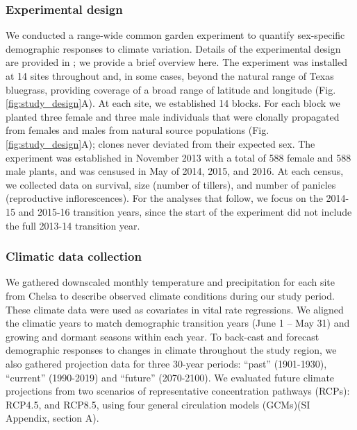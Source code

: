 \documentclass[9pt,twocolumn,twoside,lineno]{pnas-new}
\newcommand{\revise}[1]{{\color{Mahogany}{#1}}}
\begin{document}
\subsubsection*{Experimental design}
We conducted a range-wide common garden experiment to quantify sex-specific demographic responses to climate variation. 
Details of the experimental design are provided in \cite{miller2022two}; we provide a brief overview here. 
The experiment was installed at 14 sites throughout and, in some cases, beyond the natural range of Texas bluegrass, providing coverage of a broad range of latitude and longitude (Fig. \ref{fig:study_design}A).
At each site, we established 14 blocks. 
For each block we planted three female and three male individuals that were clonally propagated from females and males from \revise{\linelabel{sourcepop} seven} natural source populations (Fig. \ref{fig:study_design}A); clones never deviated from their expected sex. 
The experiment was established in November 2013 with a total of 588 female and 588 male plants, and was censused in May of 2014, 2015, and 2016. 
At each census, we collected data on survival, size (number of tillers), and number of panicles (reproductive inflorescences). 
For the analyses that follow, we focus on the 2014-15 and 2015-16 transition years, since the start of the experiment did not include the full 2013-14 transition year. 

\subsubsection*{Climatic data collection}
We gathered downscaled monthly temperature and precipitation for each site from Chelsa \citep{karger2017climatologies} to describe observed climate conditions during our study period.
These climate data were used as covariates in vital rate regressions. 
We aligned the climatic years to match demographic transition years (June 1 -- May 31) and growing and dormant seasons within each year.
To back-cast and forecast demographic responses to changes in climate throughout the study region, we also gathered projection data for three 30-year periods: ``past'' (1901-1930), ``current'' (1990-2019) and ``future'' (2070-2100).
We evaluated future climate projections from two scenarios of representative concentration pathways (RCPs): RCP4.5, and RCP8.5, using four general circulation models (GCMs)(SI Appendix, section A). 
\end{document}
